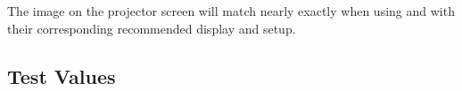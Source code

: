 The image on the projector screen will match nearly exactly when using \transformID{\id} and  with their corresponding recommended display and setup.


\subsection{Test Values}
\testValuesSubSec{}